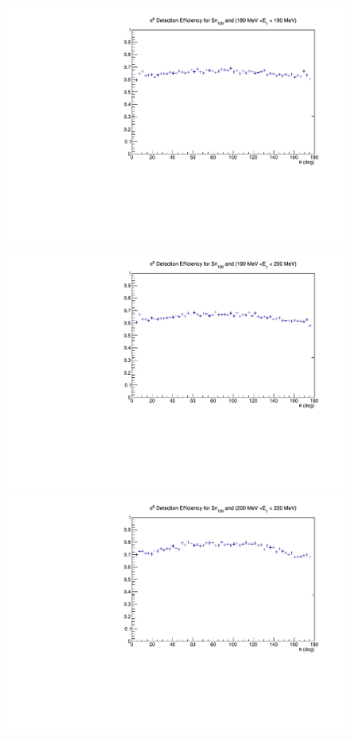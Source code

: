 \begin{figure}[H]
\begin{center}
\includegraphics[scale=0.4]{pictures/pdf/pi0_efficiency_Sn120_Ebin6.pdf}
\includegraphics[scale=0.4]{pictures/pdf/pi0_efficiency_Sn120_Ebin7.pdf}
\includegraphics[scale=0.4]{pictures/pdf/pi0_efficiency_Sn120_Ebin8.pdf}

\end{center}
\end{figure}
